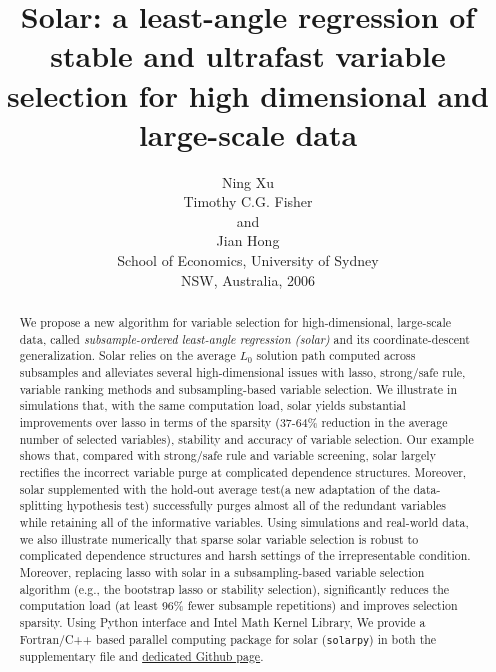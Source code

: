 \documentclass[12pt]{article}
\begin{document}

\title{\bf Solar: a least-angle regression of stable and ultrafast variable selection for high dimensional and large-scale data}
\author{Ning Xu \hspace{.4cm}\\
  Timothy C.G. Fisher \hspace{.4cm}\\
  and \hspace{.4cm}\\
  Jian Hong \hspace{.4cm}\\
  School of Economics, University of Sydney \hspace{.4cm}\\
  NSW, Australia, 2006}
\clearpage\maketitle

\begin{abstract}
  We propose a new algorithm for variable selection for high-dimensional, large-scale data, called \emph{subsample-ordered least-angle regression (solar)} and its coordinate-descent generalization. Solar relies on the average $L_0$ solution path computed across subsamples and alleviates several high-dimensional issues with lasso, strong/safe rule, variable ranking methods and subsampling-based variable selection. We illustrate in simulations that, with the same computation load, solar yields substantial improvements over lasso in terms of the sparsity (37-64\% reduction in the average number of selected variables), stability and accuracy of variable selection. Our example shows that, compared with strong/safe rule and variable screening, solar largely rectifies the incorrect variable purge at complicated dependence structures. Moreover, solar supplemented with the hold-out average test(a new adaptation of the data-splitting hypothesis test) successfully purges almost all of the redundant variables while retaining all of the informative variables. Using simulations and real-world data, we also illustrate numerically that sparse solar variable selection is robust to complicated dependence structures and harsh settings of the irrepresentable condition. Moreover, replacing lasso with solar in a subsampling-based variable selection algorithm (e.g., the bootstrap lasso or stability selection), significantly reduces the computation load (at least 96\% fewer subsample repetitions) and improves selection sparsity. Using Python interface and Intel Math Kernel Library, We provide a Fortran/C++ based parallel computing package for solar (\texttt{solarpy}) in both the supplementary file and \href{https://github.com/isaac2math/solar}{dedicated Github page}.
\end{abstract}
\end{document}
